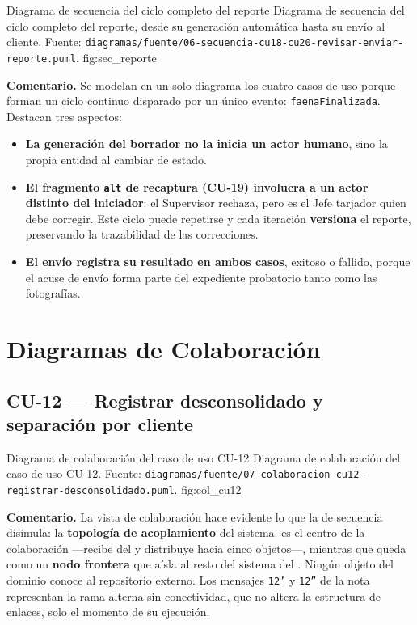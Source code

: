 {Diagrama de secuencia del ciclo completo del reporte}
{Diagrama de secuencia del ciclo completo del reporte, desde su generación automática hasta su
envío al cliente. Fuente:
\texttt{diagramas/fuente/06-secuencia-cu18-cu20-revisar-enviar-reporte.puml}.}
{fig:sec_reporte}

\textbf{Comentario.} Se modelan en un solo diagrama los cuatro casos de uso porque forman un ciclo
continuo disparado por un único evento: \texttt{faenaFinalizada}. Destacan tres aspectos:

\begin{itemize}
    \item \textbf{La generación del borrador no la inicia un actor humano}, sino la propia entidad
           al cambiar de estado.
    \item \textbf{El fragmento \texttt{alt} de recaptura (CU-19) involucra a un actor distinto del
          iniciador}: el Supervisor rechaza, pero es el Jefe tarjador quien debe corregir. Este
          ciclo puede repetirse y cada iteración \textbf{versiona} el reporte, preservando la
          trazabilidad de las correcciones.
    \item \textbf{El envío registra su resultado en ambos casos}, exitoso o fallido, porque el
          acuse de envío forma parte del expediente probatorio tanto como las fotografías.
\end{itemize}

\section{Diagramas de Colaboración}
\label{sec:colaboracion}

\subsection{CU-12 --- Registrar desconsolidado y separación por cliente}
\label{subsec:col_cu12}

{Diagrama de colaboración del caso de uso CU-12}
{Diagrama de colaboración del caso de uso CU-12. Fuente:
\texttt{diagramas/fuente/07-colaboracion-cu12-registrar-desconsolidado.puml}.}
{fig:col_cu12}

\textbf{Comentario.} La vista de colaboración hace evidente lo que la de secuencia disimula: la
\textbf{topología de acoplamiento} del sistema.  es el centro de la colaboración
---recibe del  y distribuye hacia cinco objetos---, mientras que
 queda como un \textbf{nodo frontera} que aísla al resto del sistema
del . Ningún objeto del dominio conoce al repositorio externo. Los mensajes
\texttt{12'} y \texttt{12''} de la nota representan la rama alterna sin conectividad, que no altera
la estructura de enlaces, solo el momento de su ejecución.

